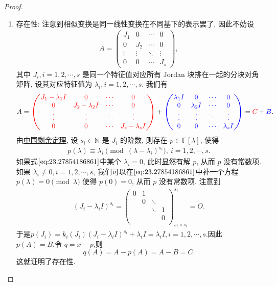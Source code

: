 \documentclass[../../main.tex]{subfiles}%
\begin{document}
\begin{proof}
\begin{enumerate}
\item {\heiti 存在性:} 注意到相似变换是同一线性变换在不同基下的表示罢了, 因此不妨设
\begin{align*}
A = \begin{pmatrix}
J_1 & 0 & \cdots & 0 \\
0 & J_2 & \cdots & 0 \\
\vdots & \vdots & \ddots & \vdots \\
0 & 0 & \cdots & J_s
\end{pmatrix},
\end{align*}
其中 \( J_i, i = 1, 2, \cdots, s \) 是同一个特征值对应所有 Jordan 块排在一起的分块对角矩阵, 设其对应特征值为 \( \lambda_i, i = 1, 2, \cdots, s \).
我们有
\[
A = {\color{red} \begin{pmatrix}
J_1 - \lambda_1 I & 0 & \cdots & 0 \\
0 & J_2 - \lambda_2 I & \cdots & 0 \\
\vdots & \vdots & \ddots & \vdots \\
0 & 0 & \cdots & J_s - \lambda_s I
\end{pmatrix}} + {\color{blue} \begin{pmatrix}
\lambda_1 I & 0 & \cdots & 0 \\
0 & \lambda_2 I & \cdots & 0 \\
\vdots & \vdots & \ddots & \vdots \\
0 & 0 & \cdots & \lambda_s I
\end{pmatrix}} = {\color{red} C} + {\color{blue} B}.
\]
由\hyperref[theorem:中国剩余定理(多项式版)]{中国剩余定理}, 设 \( s_i \in \mathbb{N} \) 是 \( J_i \) 的阶数, 则存在 \( p \in \mathbb{F}[\lambda] \), 使得
\begin{align}
p(\lambda) \equiv \lambda_i \pmod{(\lambda - \lambda_i)^{s_i}},\ i = 1, 2, \cdots, s. \label{eq:23.27854186861}
\end{align}
如果式\(\eqref{eq:23.27854186861}\)中某个 \( \lambda_i = 0 \), 此时显然有解 \( p \), 从而 \( p \) 没有常数项. 如果 \( \lambda_i \neq 0, i = 1, 2, \cdots, s \), 我们可以在\(\eqref{eq:23.27854186861}\)中补一个方程 \( p(\lambda) = 0 \pmod{\lambda} \) 使得 \( p(0) = 0 \), 从而 \( p \) 没有常数项.
注意到
\begin{align*}
\left( J_i-\lambda _iI \right) ^{s_i}=\left( \begin{matrix}
0&		1&		&		\\
&		0&		\ddots&		\\
&		&		\ddots&		1\\
&		&		&		0\\
\end{matrix} \right) _{s_i\times s_i}^{s_i}=O.
\end{align*}
于是$p(J_i)=k_i\left( J_i \right) \left( J_i-\lambda _iI \right) ^{s_i}+\lambda _iI=\lambda _iI,i=1,2,\cdots ,s.$因此 \( p(A) = B.\)令 \( q = x - p \),则
\[
 q(A) = A-p(A)=A-B=C.
\]
这就证明了存在性.


\end{enumerate}
\end{proof}
\end{document}
